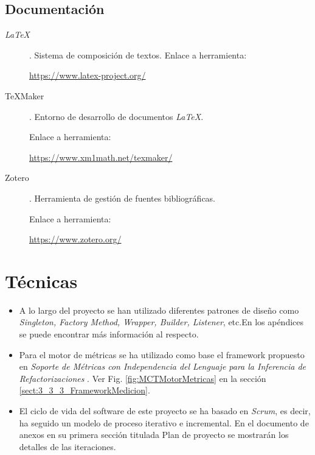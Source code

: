 \subsection{Documentación}
\begin{description}
	\item[\textit{LaTeX}]. Sistema de composición de textos.
		Enlace a herramienta:
		
		\url{https://www.latex-project.org/}
		
	\item[TeXMaker]. Entorno de desarrollo de documentos \textit{LaTeX}.
	
		Enlace a herramienta:
		
		\url{https://www.xm1math.net/texmaker/}
	
	\item[Zotero]. Herramienta de gestión de fuentes bibliográficas.
		
		Enlace a herramienta:
		
		\url{https://www.zotero.org/}
	
\end{description}
\section{Técnicas}
\begin{itemize}
	\item A lo largo del proyecto se han utilizado diferentes patrones de diseño \cite{gamma_patrones_2002} como \textit{Singleton, Factory Method, Wrapper, Builder, Listener}, etc.En los apéndices se puede encontrar más información al respecto.
	
	\item Para el motor de métricas se ha utilizado como base el framework propuesto en \textit{Soporte de Métricas con Independencia del Lenguaje para la Inferencia de Refactorizaciones} \cite{marticorena_sanchez_soporte_2005}. Ver Fig. \ref{fig:MCTMotorMetricas} en la sección \ref{sect:3_3_3_FrameworkMedicion}.
	
	\item El ciclo de vida del software de este proyecto se ha basado en \textit{Scrum}\cite{scrum_master_scrum_2019}, es decir, ha seguido un modelo de proceso iterativo e incremental. En el documento de anexos en su primera sección titulada Plan de proyecto se mostrarán los detalles de las iteraciones.
\end{itemize}
